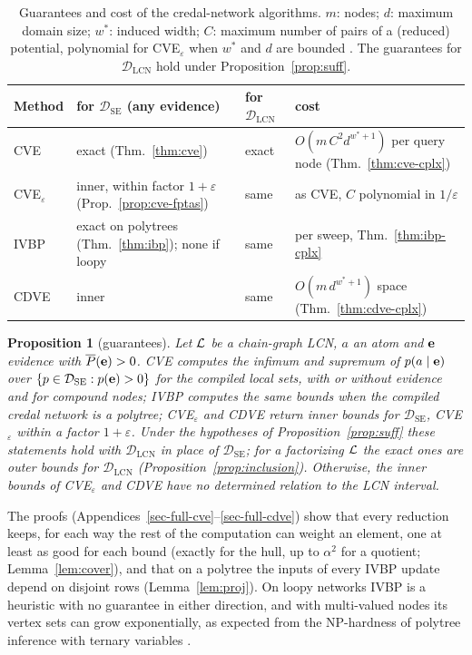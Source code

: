 \documentclass{article} %
\newenvironment{revblock}{\color{blue}}{}
\newcommand{\revcaption}{\captionsetup{font=blue}}
\newtheorem{proposition}{Proposition}
\newcommand{\DSE}{\mathcal{D}_{\mathrm{SE}}}
\newcommand{\DLCN}{\mathcal{D}_{\mathrm{LCN}}}
\begin{document}
\begin{table}[t]
\centering\small
\revcaption\caption{Guarantees and cost of the credal-network algorithms. $m$: nodes; $d$: maximum domain size; $w^*$: induced width; $C$: maximum number of pairs of a (reduced) potential, polynomial for CVE$_\varepsilon$ when $w^*$ and $d$ are bounded \citep{maua2012ijar}. The guarantees for $\DLCN$ hold under Proposition~\ref{prop:suff}.}
\label{tab:cn-algos}
\begin{revblock}
\begin{tabular}{llll}
\toprule
Method & for $\DSE$ (any evidence) & for $\DLCN$ & cost \\
\midrule
CVE & exact (Thm.~\ref{thm:cve}) & exact & $O(m\,C^2 d^{w^*+1})$ per query node (Thm.~\ref{thm:cve-cplx}) \\
CVE$_\varepsilon$ & inner, within factor $1{+}\varepsilon$ (Prop.~\ref{prop:cve-fptas}) & same & as CVE, $C$ polynomial in $1/\varepsilon$ \\
IVBP & exact on polytrees (Thm.~\ref{thm:ibp}); none if loopy & same & per sweep, Thm.~\ref{thm:ibp-cplx} \\
CDVE & inner & same & $O(m\,d^{w^*+1})$ space (Thm.~\ref{thm:cdve-cplx}) \\
\bottomrule
\end{tabular}
\end{revblock}
\end{table}

\begin{revblock}
\begin{proposition}[guarantees]\label{prop:cn-guarantees}
Let $\mathcal{L}$ be a chain-graph LCN, $a$ an atom and $\mathbf{e}$ evidence with $\overline P(\mathbf{e})>0$. CVE computes the infimum and supremum of $p(a\mid\mathbf{e})$ over $\{p\in\DSE:p(\be)>0\}$ for the compiled local sets, with or without evidence and for compound nodes; IVBP computes the same bounds when the compiled credal network is a polytree; CVE$_\varepsilon$ and CDVE return inner bounds for $\DSE$, CVE$_\varepsilon$ within a factor $1+\varepsilon$. Under the hypotheses of Proposition~\ref{prop:suff} these statements hold with $\DLCN$ in place of $\DSE$; for a factorizing $\mathcal{L}$ the exact ones are outer bounds for $\DLCN$ (Proposition~\ref{prop:inclusion}). Otherwise, the inner bounds of CVE$_\varepsilon$ and CDVE have no determined relation to the LCN interval.
\end{proposition}
\end{revblock}
The proofs (Appendices~\ref{sec-full-cve}--\ref{sec-full-cdve}) show that every reduction keeps, for each way the rest of the computation can weight an element, one at least as good for each bound (exactly for the hull, up to $\alpha^2$ for a quotient; Lemma~\ref{lem:cover}), and that on a polytree the inputs of every IVBP update depend on disjoint rows (Lemma~\ref{lem:proj}). On loopy networks IVBP is a heuristic with no guarantee in either direction, and with multi-valued nodes its vertex sets can grow exponentially, as expected from the NP-hardness of polytree inference with ternary variables \citep{maua2014jair}.
\end{document}

